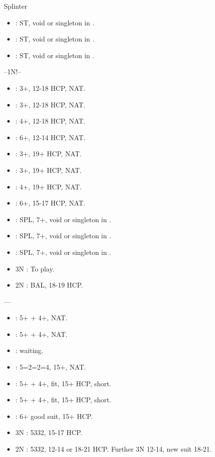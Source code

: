 \documentclass[12pt,twoside,a5paper]{report}%
\begin{document}
	Splinter
	\begin{itemize}
	\renewcommand{\labelitemi}{}
	\item {} : ST, void or singleton in \cl{}.
	\item {} : ST, void or singleton in \di{}.
	\item {} : ST, void or singleton in \he{}.
	\end{itemize}

	--1N!--
	\begin{itemize}
	\renewcommand{\labelitemi}{}
	\item {} : 3+\cl{}, 12-18 HCP, NAT.
	\item {} : 3+\di{}, 12-18 HCP, NAT.
	\item {} : 4+\he{}, 12-18 HCP, NAT.
	\item {} : 6+\sp{}, 12-14 HCP, NAT.
	\item {} : 3+\cl{}, 19+ HCP, NAT.
	\item {} : 3+\di{}, 19+ HCP, NAT.
	\item {} : 4+\he{}, 19+ HCP, NAT.
	\item {} : 6+\sp{}, 15-17 HCP, NAT.
	\item {} : SPL, 7+\sp{}, void or singleton in \cl{}.
	\item {} : SPL, 7+\sp{}, void or singleton in \di{}.
	\item {} : SPL, 7+\sp{}, void or singleton in \he{}.
	\item 3N : To play.
	\item 2N : BAL, 18-19 HCP.
	\end{itemize}

	----
	\begin{itemize}
	\renewcommand{\labelitemi}{}
	\item {} : 5+\sp{} + 4+\di{}, NAT.
	\item {} : 5+\sp{} + 4+\he{}, NAT.
	\item {} : waiting.
	\item {} : 5=2=2=4, 15+, NAT.
	\item {} : 5+\sp{} + 4+\cl{}, fit, 15+ HCP, short\di{}.
	\item {} : 5+\sp{} + 4+\cl{}, fit, 15+ HCP, short\he{}.
	\item {} : 6+\sp{} good suit, 15+ HCP.
	\item 3N : 5332, 15-17 HCP.
	\item 2N : 5332, 12-14 or 18-21 HCP. Further 3N 12-14, new suit 18-21.
	\end{itemize}
\end{document}
